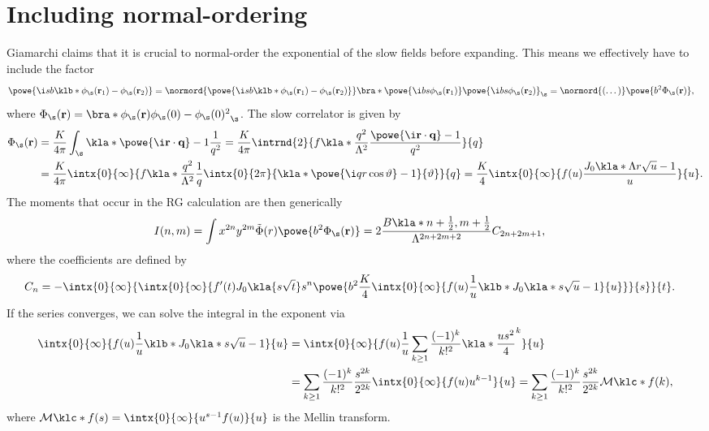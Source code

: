 \documentclass[english, parskip=full]{scrartcl}
\begin{document}
\section{Including normal-ordering}
Giamarchi claims that it is crucial to normal-order the exponential of the slow fields before expanding.
This means we effectively have to include the factor
\begin{align}
\powe{\i sb\klb*{\phi_\s(\textbf{r}_1) - \phi_\s(\textbf{r}_2)}} &= \normord{\powe{\i sb\klb*{\phi_\s(\textbf{r}_1) - \phi_\s(\textbf{r}_2)}}} \bra*{\powe{\i bs\phi_\s(\textbf{r}_1)} \powe{\i bs\phi_\s(\textbf{r}_2)}}_\s = \normord{(\dots)} \powe{b^2\Phi_\s(\textbf{r})},
\end{align}
where $\Phi_\s(\textbf{r}) = \bra*{\phi_\s(\textbf{r})\phi_\s(0) - \phi_\s(0)^2}_\s$.
The slow correlator is given by
\begin{align}
\Phi_\s(\textbf{r}) &= \frac{K}{4\pi} \int_\s \kla*{\powe{\i\textbf{r}\cdot \textbf{q}} - 1}\frac{1}{q^2} = \frac{K}{4\pi} \intrnd{2}{ f\kla*{\frac{q^2}{\Lambda^2}} \frac{\powe{\i \textbf{r}\cdot \textbf{q}} - 1}{q^2} }{q}\\ &= \frac{K}{4\pi} \intx{0}{\infty}{ f\kla*{\frac{q^2}{\Lambda^2}} \frac{1}{q} \intx{0}{2\pi}{ \kla*{\powe{\i qr\cos\vartheta} - 1} }{\vartheta} }{q} = \frac{K}{4} \intx{0}{\infty}{ f(u) \frac{J_0\kla*{\Lambda r\sqrt{u}} - 1}{u} }{u}.
\end{align}
The moments that occur in the RG calculation are then generically
\begin{align}
I(n,m) &= \int x^{2n} y^{2m} \tilde{\Phi}(r) \powe{b^2\Phi_\s(\textbf{r})} = 2\frac{B\kla*{n+\frac{1}{2}, m+\frac{1}{2}}}{\Lambda^{2n+2m+2}} C_{2n+2m+1},
\end{align}
where the coefficients are defined by
\begin{align}
C_n &= -\intx{0}{\infty}{\intx{0}{\infty}{f'(t) J_0\kla{s\sqrt{t}} s^n \powe{b^2 \frac{K}{4} \intx{0}{\infty}{ f(u) \frac{1}{u} \klb*{J_0\kla*{s\sqrt{u}} - 1} }{u}}}{s}}{t}.
\end{align}
If the series converges, we can solve the integral in the exponent via
\begin{align}
\intx{0}{\infty}{ f(u) \frac{1}{u} \klb*{J_0\kla*{s\sqrt{u}} - 1} }{u} &= \intx{0}{\infty}{ f(u) \frac{1}{u} \sum_{k\ge 1} \frac{(-1)^k}{k!^2} \kla*{\frac{us^2}{4}}^k }{u} \\
&= \sum_{k\ge 1} \frac{(-1)^k}{k!^2} \frac{s^{2k}}{2^{2k}} \intx{0}{\infty}{f(u)u^{k-1}}{u} = \sum_{k\ge 1} \frac{(-1)^k}{k!^2} \frac{s^{2k}}{2^{2k}} \mathcal{M}\klc*{f}(k),
\end{align}
where $\mathcal{M}\klc*{f}(s) = \intx{0}{\infty}{u^{s-1} f(u)}{u}$ is the Mellin transform.
\end{document}
